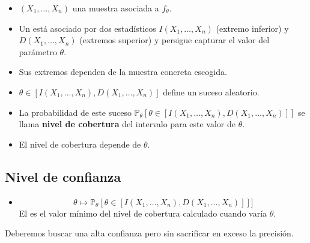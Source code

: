 \begin{tcolorbox}[colback=blue!5!white, colframe=blue!75!black, title=\textbf{Definición}]
\begin{itemize}[label=\textbullet]
    \item $(X_1,\dots,X_n)$ una muestra asociada a $f_\theta$.
    \item Un  está asociado por dos estadísticos $I(X_1,\dots,X_n)$ (extremo inferior) y $D(X_1,\dots,X_n)$ (extremos superior) y persigue capturar el valor del parámetro $\theta$.
\end{itemize}
\end{tcolorbox}
\begin{tcolorbox}[colback=red!5!white, colframe=red!75!black, title=\textbf{Un intervalo de estimación es aleatorio}]
\begin{itemize}[label=\textbullet]
    \item Sus extremos dependen de la muestra concreta escogida.
    \item $\theta \in [I(X_1,\dots,X_n),D(X_1,\dots,X_n)]$ define un suceso aleatorio.
    \item La probabilidad de este suceso $\mathbb{P}_\theta[\theta\in [I(X_1,\dots,X_n),D(X_1,\dots,X_n)]]$ se llama \textbf{nivel de cobertura} del intervalo para este valor de $\theta$.
    \item El nivel de cobertura depende de $\theta$.
\end{itemize}
\end{tcolorbox}
\subsection{Nivel de confianza}
\begin{itemize}[label=\color{red}\textbullet, leftmargin=*]
    \item {} \[
            \theta\longmapsto \mathbb{P}_\theta[\theta\in [I(X_1,\dots,X_n),D(X_1,\dots,X_n)]]]
    \] 
    El  es el valor mínimo del nivel de cobertura calculado cuando varía $\theta$. 
\end{itemize}
\begin{tcolorbox}[colback=olive!5!white, colframe=olive!75!black, title=\textbf{Confianza vs Precisión}]
Deberemos buscar una alta confianza pero sin sacrificar en exceso la precisión.
\end{tcolorbox}
